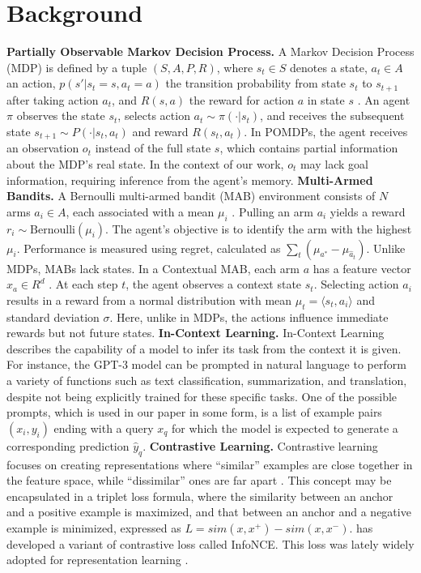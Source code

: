 \documentclass{article}
\theoremstyle{plain}
\theoremstyle{definition}
\theoremstyle{remark}
\begin{document}
\section{Background}
\label{appendix:background}
\textbf{Partially Observable Markov Decision Process.}
A Markov Decision Process (MDP) is defined by a tuple $(S, A, P, R)$, where $s_t \in S$ denotes a state, $a_t \in A$ an action, $p(s' | s_t = s, a_t = a)$ the transition probability from state $s_t$ to $s_{t+1}$ after taking action $a_t$, and $R(s, a)$ the reward for action $a$ in state $s$ \citep{sutton2018reinforcement}. An agent $\pi$ observes the state $s_t$, selects action $a_t \sim \pi(\cdot|s_t)$, and receives the subsequent state $s_{t+1} \sim P(\cdot | s_t, a_t)$ and reward $R(s_t, a_t)$. In POMDPs, the agent receives an observation $o_t$ instead of the full state $s$, which contains partial information about the MDP's real state. In the context of our work, $o_t$ may lack goal information, requiring inference from the agent's memory.
\textbf{Multi-Armed Bandits.}
A Bernoulli multi-armed bandit (MAB) environment consists of $N$ arms $a_i \in A$, each associated with a mean $\mu_i$ \citep{sutton2018reinforcement}. Pulling an arm $a_i$ yields a reward $r_i \sim \text{Bernoulli}(\mu_i)$. The agent's objective is to identify the arm with the highest $\mu_i$. Performance is measured using regret, calculated as $\sum_t(\mu_{a^*} - \mu_{\hat{a}_t})$. Unlike MDPs, MABs lack states.
In a Contextual MAB, each arm $a$ has a feature vector $x_a \in R^d$ \citep{sutton2018reinforcement}. At each step $t$, the agent observes a context state $s_t$. Selecting action $a_i$ results in a reward from a normal distribution with mean $\mu_t = \langle s_t, a_i \rangle$ and standard deviation $\sigma$. Here, unlike in MDPs, the actions influence immediate rewards but not future states.
\textbf{In-Context Learning.} In-Context Learning describes the capability of a model to infer its task from the context it is given. For instance, the GPT-3 model \citep{brown2020language} can be prompted in natural language to perform a variety of functions such as text classification, summarization, and translation, despite not being explicitly trained for these specific tasks. One of the possible prompts, which is used in our paper in some form, is a list of example pairs $(x_i, y_i)$ ending with a query $x_q$ for which the model is expected to generate a corresponding prediction $\hat{y}_q$.
\textbf{Contrastive Learning.} Contrastive learning focuses on creating representations where “similar” examples are close together in the feature space, while “dissimilar” ones are far apart \citep{weinberger2009distance, schroff2015facenet}. This concept may be encapsulated in a triplet loss formula, where the similarity between an anchor and a positive example is maximized, and that between an anchor and a negative example is minimized, expressed as $L = sim(x, x^+) - sim(x,x^-)$. \citet{oord2018representation} has developed a variant of contrastive loss called InfoNCE. This loss was lately widely adopted for representation learning \citep{jaiswal2020survey}.
\end{document}
